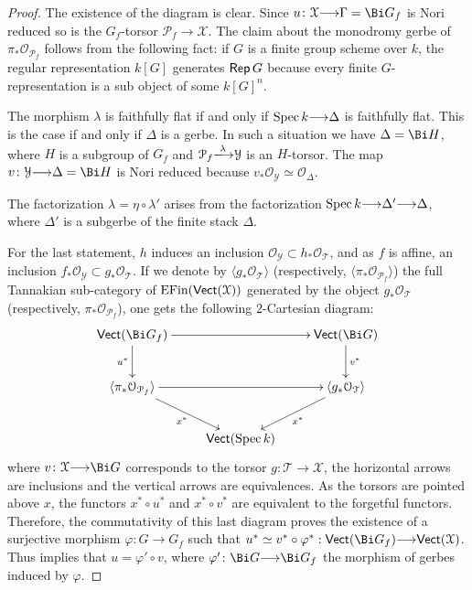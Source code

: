 \documentclass[12pt,reqno]{amsart}
\theoremstyle{plain}
\theoremstyle{definition}
\numberwithin{thm}{section}
\newcounter{x}\setcounter{x}{1}
\theoremstyle{plain}
\begin{document}
\begin{proof}
The existence of the diagram is clear. Since $u\colon {\mathcal{X}}{\longrightarrow} \Gamma=\Bi G_f$ is Nori reduced so 
is the $G_f$-torsor ${\mathcal{P}}_f{\longrightarrow}{\mathcal{X}}$. The claim about the monodromy gerbe of $\pi_*{\mathcal{O}_{{{\mathcal{P}}_f}}}$ 
follows from the following fact: if $G$ is a finite group scheme over $k$, the regular 
representation $k[G]$ generates ${\text{\sf Rep\,}} G$ because every finite $G$-representation is a sub object 
of some $k[G]^n$.
 
The morphism $\lambda$ is faithfully flat if and only if ${{\rm Spec \,}} k{\longrightarrow} \Delta$ is faithfully flat. 
This is the case if and only if $\Delta$ is a gerbe. In such a situation
we have $\Delta=\Bi H$, where $H$ is a 
subgroup of $G_f$ and ${\mathcal{P}}_f{\xlongrightarrow{\lambda}} {\mathcal{Y}}$ is an $H$-torsor. The map $v\colon {\mathcal{Y}}{\longrightarrow} 
\Delta=\Bi H$ is Nori reduced because $v_*{\mathcal{O}_{\mathcal{Y}}}\simeq {\mathcal{O}_{\Delta}}$.

The factorization $\lambda = \eta \circ \lambda '$ arises from the factorization ${{\rm Spec \,}} k {\longrightarrow} 
\Delta ' {\longrightarrow} \Delta$, where $\Delta ' $ is a subgerbe of the finite stack $\Delta $.

For the last statement, $h$ induces an inclusion ${\mathcal{O}_{\mathcal{Y}}} \subset h_* {\mathcal{O}_{{\mathcal{T}}}}$, and as $f$ is 
affine, an inclusion $f_*{\mathcal{O}_{\mathcal{Y}}} \subset g_* {\mathcal{O}_{{\mathcal{T}}}}$. If we denote by $\langle g_* 
{\mathcal{O}_{{\mathcal{T}}}}\rangle$ (respectively, $\langle\pi _* {\mathcal{O}_{{{\mathcal{P}}_f}}}\rangle$) the full Tannakian sub-category of 
${{\rm EFin}} ({\text{\sf Vect}} ({\mathcal{X}}))$ generated by the object $g_* {\mathcal{O}_{{\mathcal{T}}}}$ (respectively, $\pi _* {\mathcal{O}_{{{\mathcal{P}}_f}}}$), one 
gets the following $2$-Cartesian diagram:
$$\xymatrix{
{\text{\sf Vect}} (\Bi G_f) \ar[rr] \ar[d]_{u^*} &&{\text{\sf Vect}} (\Bi G)\ar[d]^{v^*}\\
\langle\pi _* {\mathcal{O}_{{{\mathcal{P}}_f}}}\rangle\ar[dr]_{x^*} \ar[rr] &&\langle g_* {\mathcal{O}_{{\mathcal{T}}}}\rangle\ar[dl]^{x^*}\\
&{\text{\sf Vect}} ({{\rm Spec \,}} k)&\\
}$$
where $v \colon {\mathcal{X}} {\longrightarrow} \Bi G$ corresponds to the torsor $g \colon {\mathcal{T}} {\longrightarrow} {\mathcal{X}}$, the horizontal
arrows are inclusions and the vertical arrows are equivalences. As the torsors are pointed
above $x$, the functors $x^* \circ u^*$ and $x^* \circ v^*$ are equivalent to the
forgetful functors.
Therefore, the commutativity of this last diagram proves the existence of a surjective
morphism $\varphi \colon G {\longrightarrow} G_f$ such that $u^*\simeq v^* \circ \varphi ^* : {\text{\sf Vect}} (\Bi G_f)
{\longrightarrow} {\text{\sf Vect}} ({\mathcal{X}})$. Thus implies that $u=\varphi' \circ v$, where $\varphi' \colon
\Bi G {\longrightarrow} \Bi G_f$ the morphism of gerbes induced by $\varphi$.
\end{proof}
\end{document}
